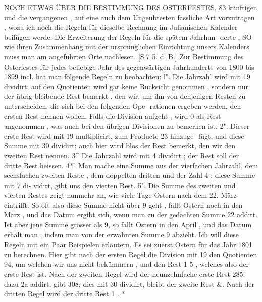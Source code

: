 \documentclass[12pt,a4paper]{article}
\begin{document}
NOCH  ETWAS  ÜBER  DIE  BESTIMMUNG  DES  OSTERFESTES.  83
künftigen  und  die  vergangenen ,  auf  eine  auch  dem  Ungeübtesten  fassliche  Art
vorzutragen ,  wozu  ich  noch  die  Regeln  für  dieselbe  Rechnung  im  Julianischen
Kalender  beifügen  werde.  Die  Erweiterung  der  Regeln  für  die  spätem  Jahrhun-
derte ,  SO  wie  ihren  Zusammenhang  mit  der  ursprünglichen  Einrichtung  unsers
Kalenders  muss  man  am  angeführten  Orte  nachlesen.   [S.7  5.  d.  B.]
Zur  Bestimmung  des  Osterfestes  für  jedes  beliebige  Jahr  des  gegenwärtigen
Jahrhunderts  von  1800  bis  1899  incl.  hat  man  folgende  Regeln  zu  beobachten:
l".  Die  Jahrzahl  wird  mit  19  dividirt;  auf  den  Quotienten  wird  gar  keine
Rücksicht  genommen ,  sondern  nur  der  übrig  bleibende  Rest  bemerkt ,  den  wir,
um  ihn  von  denjenigen  Resten  zu  unterscheiden,  die  sich  bei  den  folgenden  Ope-
rationen ergeben  werden,  den  ersten  Rest  nennen  wollen.  Falls  die  Division
aufgeht ,  wird  0  als  Rest  angenommen ,  was  auch  bei  den  übrigen  Divisionen
zu  bemerken  ist.
2".  Dieser  erste  Rest  wird  mit  19  multiplicirt,  zum  Producte  23  hinzuge-
fügt, und  diese  Summe  mit  30  dividirt;  auch  hier  wird  blos  der  Rest  bemerkt,
den  wir  den  zweiten  Rest  nennen.
3\^{}    Die  Jahrzahl  wird  mit  4  dividirt ;  der  Rest  soll  der  dritte  Rest  heissen.
4*'.  Man  mache  eine  Summe  aus  der  vierfachen  Jahrzahl,  dem  sechsfachen
zweiten  Reste ,  dem  doppelten  dritten  und  der  Zahl  4 ;  diese  Summe  mit  7  di-
vidirt, gibt  uns  den  vierten  Rest.
5".  Die  Summe  des  zweiten  und  vierten  Restes  zeigt  nunmehr  an,  wie
viele  Tage  Ostern  nach  dem  22.  März  eintrifft.  So  oft  also  diese  Summe  nicht
über  9  geht ,  fällt  Ostern  noch  in  den  März ,  und  das  Datum  ergibt  sich,  wenn
man  zu  der  gedachten  Summe  22  addirt.  Ist  aber  jene  Summe  grösser  als  9,
so  fallt  Ostern  in  den  April ,  und  das  Datum  erhält  man ,  indem  man  von  der
erwähnten  Summe  9  abzieht.
Ich  will  diese  Regeln  mit  ein  Paar  Beispielen  erläutern.  Es  sei  zuerst
Ostern  für  das  Jahr  1801  zu  berechnen.     Hier  gibt
nach  der  ersten  Regel  die  Division  mit  19  den  Quotienten  94,  um  welchen
wir  uns  nicht  bekümmern ,  und  den  Rest  1 5 ,  welches  also  der  erste  Rest  ist.
Nach  der  zweiten  Regel  wird  der  neunzehnfache  erste  Rest  285;  dazu  2a
addirt,  gibt  308;  dies  mit  30  dividirt,  bleibt  der  zweite  Rest  \&.
Nach  der  dritten  Regel  wird  der  dritte  Rest   1 .
*
\end{document}
